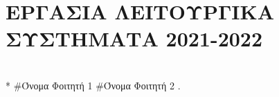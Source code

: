\documentclass{article}
\begin{document}
\section*{ΕΡΓΑΣΙΑ ΛΕΙΤΟΥΡΓΙΚΑ ΣΥΣΤΗΜΑΤΑ 2021-2022}\\*
\#Όνομα Φοιτητή 1 
\#Όνομα Φοιτητή 2
\textgreek{}.
\end{document}
